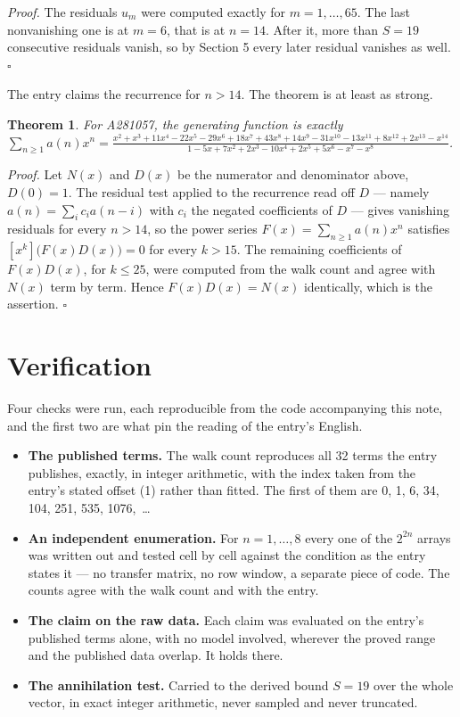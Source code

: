 \documentclass[11pt]{article}
\newtheorem{theorem}{Theorem}
\theoremstyle{definition}
\begin{document}
{\itshape Proof.} The residuals $u_m$ were computed exactly for $m = 1,\dots,65$. The last nonvanishing one is at $m = 6$, that is at $n = 14$. After it, more than $S = 19$ consecutive residuals vanish, so by Section 5 every later residual vanishes as well. $\square$

The entry claims the recurrence for $n > 14$. The theorem is at least as strong.

\begin{theorem} For A281057, the generating function is exactly $\sum_{n\ge 1} a(n)x^n = \frac{x^{2} + x^{3} + 11x^{4} - 22x^{5} - 29x^{6} + 18x^{7} + 43x^{8} + 14x^{9} - 31x^{10} - 13x^{11} + 8x^{12} + 2x^{13} - x^{14}}{1 - 5x + 7x^{2} + 2x^{3} - 10x^{4} + 2x^{5} + 5x^{6} - x^{7} - x^{8}}$.\end{theorem}

{\itshape Proof.} Let $N(x)$ and $D(x)$ be the numerator and denominator above, $D(0)=1$. The residual test applied to the recurrence read off $D$ --- namely $a(n) = \sum_i c_i a(n-i)$ with $c_i$ the negated coefficients of $D$ --- gives vanishing residuals for every $n > 14$, so the power series $F(x)=\sum_{n\ge 1}a(n)x^n$ satisfies $[x^k]\bigl(F(x)D(x)\bigr) = 0$ for every $k > 15$. The remaining coefficients of $F(x)D(x)$, for $k \le 25$, were computed from the walk count and agree with $N(x)$ term by term. Hence $F(x)D(x) = N(x)$ identically, which is the assertion. $\square$

\section{Verification}

Four checks were run, each reproducible from the code accompanying this note, and the first two are what pin the reading of the entry's English.

\begin{itemize}

\item {\bfseries The published terms.} The walk count reproduces all 32 terms the entry publishes, exactly, in integer arithmetic, with the index taken from the entry's stated offset (1) rather than fitted. The first of them are 0, 1, 6, 34, 104, 251, 535, 1076,~\dots

\item {\bfseries An independent enumeration.} For $n = 1,\dots,8$ every one of the $2^{2n}$ arrays was written out and tested cell by cell against the condition as the entry states it --- no transfer matrix, no row window, a separate piece of code. The counts agree with the walk count and with the entry.

\item {\bfseries The claim on the raw data.} Each claim was evaluated on the entry's published terms alone, with no model involved, wherever the proved range and the published data overlap. It holds there.

\item {\bfseries The annihilation test.} Carried to the derived bound $S = 19$ over the whole vector, in exact integer arithmetic, never sampled and never truncated.

\end{itemize}
\end{document}
